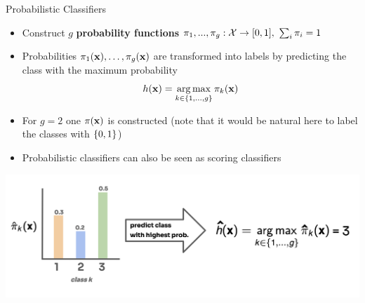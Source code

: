 \documentclass[11pt,compress,t,notes=noshow, xcolor=table]{beamer}
\begin{document}
\begin{vbframe}{Probabilistic Classifiers}
\begin{itemize}
\item Construct $g$ \textbf{probability functions} $\pi_1, ..., \pi_g: \Xspace \to [0, 1],~\sum_i \pi_i = 1$ 
\item Probabilities $\pi_1(\xv), \ldots, \pikx[g]$ are transformed into labels by predicting the class with the maximum probability
$$
\hx = \argmax_{k \in \gset} \pikx
$$ 
\item For $g = 2$ one $\pix$ is constructed (note that it would be natural here to label the classes with $\setzo$)

\item Probabilistic classifiers can also be seen as scoring classifiers

\end{itemize}


\begin{center}
  \includegraphics[clip=true, trim={0 60 0 30}]{figure_man/probabilities.png} 
\end{center}
\end{vbframe}
\end{document}
